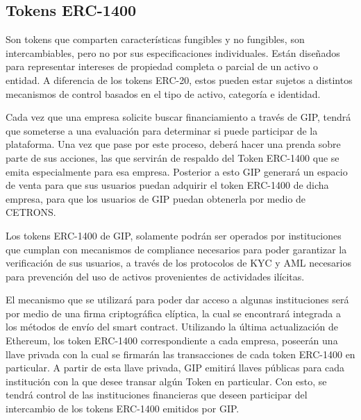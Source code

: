 \subsection{Tokens ERC-1400}
Son tokens que comparten características fungibles y no fungibles, son intercambiables, pero no por sus especificaciones individuales\cite{fungible}. Están diseñados para representar intereses de propiedad completa o parcial de un activo o entidad. A diferencia de los tokens ERC-20, estos pueden estar sujetos a distintos mecanismos de control basados en el tipo de activo, categoría e identidad\cite{erc1400}. 

Cada vez que una empresa solicite buscar financiamiento a través de GIP, tendrá que  someterse a una evaluación para determinar si puede participar  de la plataforma. Una vez que pase por este proceso, deberá hacer una prenda sobre parte de sus acciones, las que servirán de respaldo del Token ERC-1400 que se emita especialmente para esa empresa. Posterior a esto GIP generará un espacio de venta para que sus usuarios puedan adquirir el token ERC-1400 de dicha empresa, para que los usuarios de GIP puedan obtenerla por medio de CETRONS.

Los tokens ERC-1400 de GIP, solamente podrán ser operados por instituciones que cumplan con mecanismos de compliance necesarios para poder garantizar la verificación de sus usuarios, a través de los protocolos de KYC y AML necesarios para prevención del uso de activos provenientes de actividades ilícitas.

El mecanismo que se utilizará para poder dar acceso a algunas instituciones será por medio de una firma criptográfica elíptica, la cual se encontrará integrada a los métodos de envío del smart contract. Utilizando la última actualización de Ethereum\cite{eip1108}, los token ERC-1400 correspondiente a cada empresa, poseerán una llave privada con la cual se firmarán las transacciones de cada token ERC-1400 en particular. A partir de esta llave privada, GIP emitirá llaves públicas para cada institución con la que desee transar algún Token en particular. Con esto, se tendrá control de las instituciones financieras que deseen participar del intercambio de los tokens ERC-1400  emitidos por GIP.
